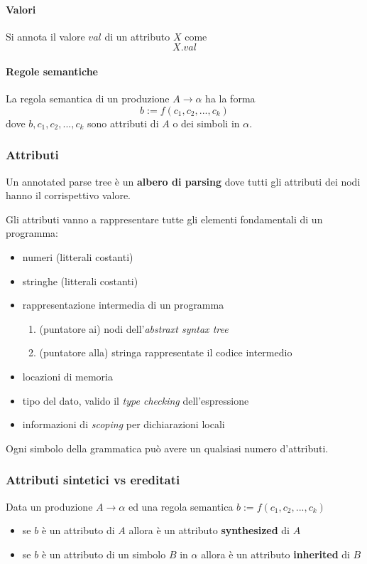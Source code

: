 \paragraph{Valori}
Si annota il valore $val$ di un attributo $X$ come $$X.val$$
\paragraph{Regole semantiche}
La regola semantica di un produzione $A \to \alpha$ ha la forma
$$b:=f(c_1,c_2,...,c_k)$$
dove $b,c_1,c_2,...,c_k$ sono attributi di $A$ o dei simboli in $\alpha$.

\subsubsection{Attributi}
\begin{definition}
Un annotated parse tree \`e un \textbf{albero di parsing} dove tutti gli
attributi dei nodi hanno il corrispettivo valore.
\end{definition}

Gli attributi vanno a rappresentare tutte gli elementi fondamentali di un
programma:
\begin{itemize}
\item numeri (litterali costanti)
\item stringhe (litterali costanti)
\item rappresentazione intermedia di un programma
\begin{enumerate}
\item (puntatore ai) nodi dell'\textit{abstraxt syntax tree}
\item (puntatore alla) stringa rappresentate il codice intermedio
\end{enumerate}
\item locazioni di memoria
\item tipo del dato, valido il \textit{type checking} dell'espressione
\item informazioni di \textit{scoping} per dichiarazioni locali
\end{itemize}

Ogni simbolo della grammatica pu\`o avere un qualsiasi numero d'attributi.

\subsubsection{Attributi sintetici vs ereditati}
\begin{definition}
Data un produzione $A \to \alpha$ ed una regola semantica
$b:=f(c_1,c_2,...,c_k)$
\begin{itemize}
\item se $b$ \`e un attributo di $A$ allora \`e un attributo
\textbf{synthesized} di $A$
\item se $b$ \`e un attributo di un simbolo $B$ in $\alpha$ allora \`e un
attributo \textbf{inherited} di $B$
\end{itemize}
\end{definition}

